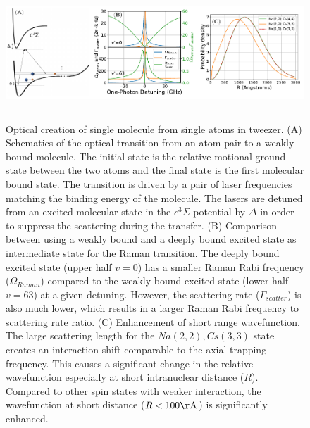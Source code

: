 \documentclass[aps,prl,twocolumn,groupedaddress]{revtex4-1}
\begin{document}
\begin{figure}
  \includegraphics[height=5cm]{fig1.pdf}
  \caption{Optical creation of single molecule from single atoms in tweezer.
    (A) Schematics of the optical transition from an atom pair to a weakly bound molecule.
    The initial state is the relative motional ground state between the two atoms
    and the final state is the first molecular bound state.
    The transition is driven by a pair of laser frequencies matching the binding energy
    of the molecule.
    The lasers are detuned from an excited molecular state in the $c^3\Sigma$ potential
    by $\Delta$ in order to suppress the scattering during the transfer.
    (B) Comparison between using a weakly bound and a deeply bound excited state
    as intermediate state for the Raman transition.
    The deeply bound excited state (upper half $v=0$) has a smaller Raman Rabi frequency ($\Omega_{Raman}$)
    compared to the weakly bound excited state (lower half $v=63$) at a given detuning.
    However, the scattering rate ($\Gamma_{scatter}$) is also much lower,
    which results in a larger Raman Rabi frequency to scattering rate ratio.
    (C) Enhancement of short range wavefunction.
    The large scattering length for the $Na(2,2),Cs(3,3)$ state creates an interaction shift
    comparable to the axial trapping frequency.
    This causes a significant change in the relative wavefunction especially at short
    intranuclear distance ($R$).
    Compared to other spin states with weaker interaction,
    the wavefunction at short distance ($R<100\mathrm{\AA}$) is significantly enhanced.
    \label{f-theory}
  }
\end{figure}





\end{document}
